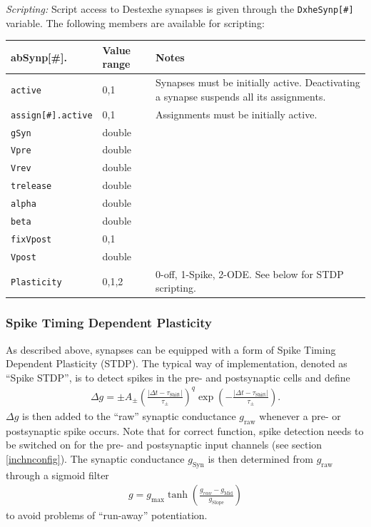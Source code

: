 \documentclass{article}
\begin{document}
\noindent
\emph{Scripting:} Script access to Destexhe synapses is given through the \texttt{DxheSynp[\#]} variable.
The following members are available for scripting: \\
\begin{tabularx}{\linewidth}{|ll|X|}
	\hline
	{\bf abSynp[\#].\textvisiblespace} & {\bf Value range} & {\bf Notes} \\
	\hline
	\texttt{active} & 0,1 & Synapses must be initially active. Deactivating a synapse suspends all
	its assignments. \\
	\texttt{assign[\#].active} & 0,1 & Assignments must be initially active. \\
	\texttt{gSyn} & double & \\
	\texttt{Vpre} & double & \\
	\texttt{Vrev} & double & \\
	\texttt{trelease} & double & \\
	\texttt{alpha} & double & \\
	\texttt{beta} & double & \\
	\texttt{fixVpost} & 0,1 & \\
	\texttt{Vpost} & double & \\
	\texttt{Plasticity} & 0,1,2 & 0-off, 1-Spike, 2-ODE. See below for STDP scripting. \\
	\hline
\end{tabularx}

\subsubsection{Spike Timing Dependent Plasticity} \label{STDP}
As described above, synapses can be equipped with a form of Spike
Timing Dependent Plasticity (STDP).
The typical way of implementation, denoted as ``Spike STDP'',
is to detect spikes in the pre- and postsynaptic cells and 
define 
  \begin{align}
    \Delta g= \pm A_{\pm} \left(\frac{|\Delta t -
      \tau_{\text{Shift}}|}{\tau_{\pm}}\right)^q
    \exp\left(-\frac{|\Delta t -
      \tau_{\text{Shift}}|}{\tau_{\pm}}\right) .
  \end{align}
$\Delta g$ is then added to the ``raw'' synaptic conductance
$g_{\text{raw}}$ whenever a pre- or postsynaptic spike occurs. Note
that for correct function, spike detection needs to be switched on
for the pre- and postsynaptic input channels (see section \ref{inchnconfig}).
The synaptic conductance $g_{\text{Syn}}$ is then
determined from $g_{\text{raw}}$ through a sigmoid filter
\begin{align}
  g= g_{\text{max}} \tanh\left(\frac{g_{raw} -
    g_{\text{Mid}}}{g_{\text{Slope}}}\right) 
\end{align}
to avoid problems of ``run-away'' potentiation.
\end{document}
